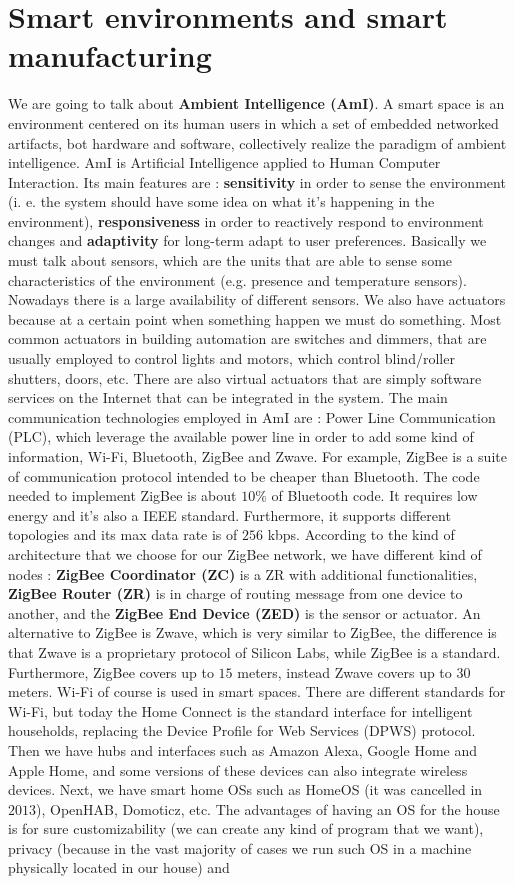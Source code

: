 \documentclass[11pt]{article}
\begin{document}
\section{Smart environments and smart manufacturing}
We are going to talk about \textbf{Ambient Intelligence (AmI)}. A smart space is an environment centered on its human users in which a set of embedded networked artifacts, bot hardware and software, collectively realize the paradigm of ambient intelligence. AmI is Artificial Intelligence applied to Human Computer Interaction. Its main features are : \textbf{sensitivity} in order to sense the environment (i. e. the system should have some idea on what it's happening in the environment), \textbf{responsiveness} in order to reactively respond to environment changes and \textbf{adaptivity} for long-term adapt to user preferences. Basically we must talk about sensors, which are the units that are able to sense some characteristics of the environment (e.g. presence and temperature sensors). Nowadays there is a large availability of different sensors. We also have actuators because at a certain point when something happen we must do something. Most common actuators in building automation are switches and dimmers, that are usually employed to control lights and motors, which control blind/roller shutters, doors, etc. There are also virtual actuators that are simply software services on the Internet that can be integrated in the system. The main communication technologies employed in AmI are : Power Line Communication (PLC), which leverage the available power line in order to add some kind of information, Wi-Fi, Bluetooth, ZigBee and Zwave. For example, ZigBee is a suite of communication protocol intended to be cheaper than Bluetooth. The code needed to implement ZigBee is about $10 \%$ of Bluetooth code. It requires low energy and it's also a IEEE standard. Furthermore, it supports different topologies and its max data rate is of $256$ kbps. According to the kind of architecture that we choose for our ZigBee network, we have different kind of nodes : \textbf{ZigBee Coordinator (ZC)} is a ZR with additional functionalities, \textbf{ZigBee Router (ZR)} is in charge of routing message from one device to another, and the \textbf{ZigBee End Device (ZED)} is the sensor or actuator. An alternative to ZigBee is Zwave, which is very similar to ZigBee, the difference is that Zwave is a proprietary protocol of Silicon Labs, while ZigBee is a standard. Furthermore, ZigBee covers up to $15$ meters, instead Zwave covers up to $30$ meters. Wi-Fi of course is used in smart spaces. There are different standards for Wi-Fi, but today the Home Connect is the standard interface for intelligent households, replacing the Device Profile for Web Services (DPWS) protocol. Then we have hubs and interfaces such as Amazon Alexa, Google Home and Apple Home, and some versions of these devices can also integrate wireless devices. Next, we have smart home OSs such as HomeOS (it was cancelled in $2013$), OpenHAB, Domoticz, etc. The advantages of having an OS for the house is for sure customizability (we can create any kind of program that we want), privacy (because in the vast majority of cases we run such OS in a machine physically located in our house) and 
\end{document}
